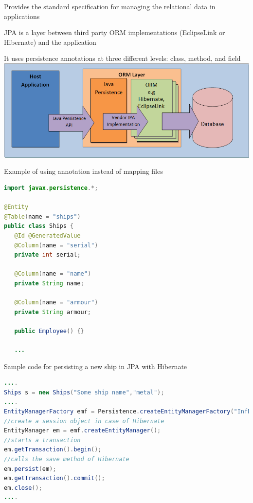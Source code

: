 \documentclass{beamer}
\begin{document}
\begin{slide}{
\item Provides the standard specification for managing the relational data in applications
\item JPA is a layer between third party ORM implementations (EclipseLink or Hibernate) and the application 
\item It uses persistence annotations at three different levels: class, method, and field
\\
\includegraphics[scale=0.3]{img/JPA.png}
}
\end{slide} 


\begin{frame}[fragile]
Example of using annotation instead of mapping files 
\begin{lstlisting}[language=java]
import javax.persistence.*;

@Entity
@Table(name = "ships")
public class Ships {
   @Id @GeneratedValue
   @Column(name = "serial")
   private int serial;

   @Column(name = "name")
   private String name;

   @Column(name = "armour")
   private String armour; 

   public Employee() {}
   
   ...
   \end{lstlisting} 
\end{frame}


\begin{frame}[fragile]
Sample code for persisting a new ship in JPA with Hibernate 
\begin{lstlisting}[language=java]
....	 
Ships s = new Ships("Some ship name","metal");
....
EntityManagerFactory emf = Persistence.createEntityManagerFactory("InfDev5PU");
//create a session object in case of Hibernate
EntityManager em = emf.createEntityManager();
//starts a transaction 
em.getTransaction().begin();
//calls the save method of Hibernate
em.persist(em);
em.getTransaction().commit();
em.close();
....
\end{lstlisting} 
\end{frame} 
 
\end{document}

